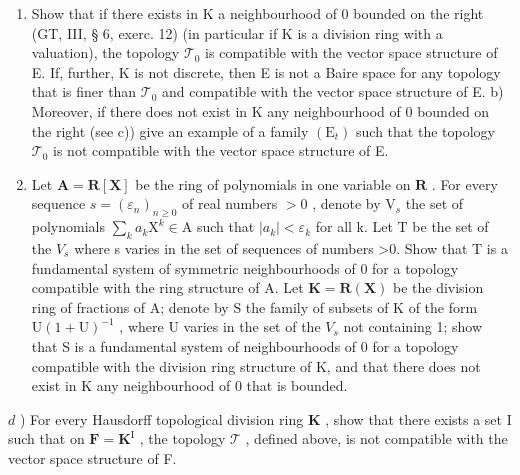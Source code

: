 \begin{enumerate}
\def\labelenumi{\alph{enumi})}
\item
  Show that if there exists in K a neighbourhood of 0 bounded on the right (GT, III, § 6, exerc. 12) (in particular if K is a division ring with a valuation), the topology \(\mathcal{T}_0\) is compatible with the vector space structure of E. If, further, K is not discrete, then E is not a Baire space for any topology that is finer than \(\mathcal{T}_0\) and compatible with the vector space structure of E. b) Moreover, if there does not exist in K any neighbourhood of 0 bounded on the right (see c)) give an example of a family \((\mathrm{E}_t)\) such that the topology \(\mathcal{T}_0\) is not compatible with the vector space structure of E.
\item
  Let \(\mathbf{A} = \mathbf{R}[\mathbf{X}]\) be the ring of polynomials in one variable on \(\mathbf{R}\) . For every sequence \(s = (\varepsilon_n)_{n\geqslant 0}\) of real numbers \(>0\) , denote by \(\mathrm{V}_s\) the set of polynomials \(\sum_k a_k\mathrm{X}^k\in \mathrm{A}\) such that \(|a_k| < \varepsilon_k\) for all k. Let T be the set of the \(V_{s}\) where s varies in the set of sequences of numbers \textgreater0. Show that T is a fundamental system of symmetric neighbourhoods of 0 for a topology compatible with the ring structure of A. Let \(\mathbf{K} = \mathbf{R}(\mathbf{X})\) be the division ring of fractions of A; denote by S the family of subsets of K of the form \(\mathrm{U}(1 + \mathrm{U})^{-1}\) , where U varies in the set of the \(V_{s}\) not containing 1; show that S is a fundamental system of neighbourhoods of 0 for a topology compatible with the division ring structure of K, and that there does not exist in K any neighbourhood of 0 that is bounded.
\end{enumerate}

\(d\) ) For every Hausdorff topological division ring \(\mathbf{K}\) , show that there exists a set I such that on \(\mathbf{F} = \mathbf{K}^{\mathrm{I}}\) , the topology \(\mathcal{T}\) , defined above, is not compatible with the vector space structure of F.
